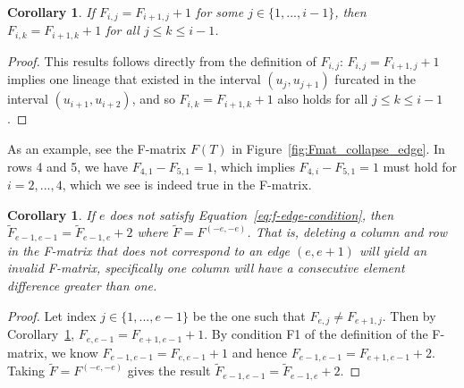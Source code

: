 \documentclass{article}
\newtheorem{corollary}[theorem]{Corollary}
\begin{document}
\begin{corollary}\label{cor:F_row_diff}
If $F_{i,j} = F_{i+1, j}+1$ for some $j\in \{1,...,i-1\}$, then $F_{i,k}= F_{i+1, k}+1$ for all $j\leq k \leq i-1$.
\end{corollary}
\begin{proof}
This results follows directly from the definition of $F_{i,j}$: $F_{i,j} = F_{i+1, j}+1$ implies one lineage that existed in the interval $(u_j,u_{j+1})$ furcated in the interval $(u_{i+1}, u_{i+2})$, and so $F_{i,k}= F_{i+1, k}+1$ also holds for all $j\leq k \leq i-1$. 
\end{proof}

As an example, see the F-matrix $F(T)$ in Figure~\ref{fig:Fmat_collapse_edge}. In rows 4 and 5, we have $F_{4,1} - F_{5,1}=1$, which implies $F_{4,i}- F_{5,1}=1$ must hold for $i=2,...,4$, which we see is indeed true in the F-matrix. 

\begin{corollary}\label{cor:F_delete_illegal_row}
If $e$ does not satisfy Equation~\ref{eq:f-edge-condition}, then $\tilde{F}_{e-1, e-1} = \tilde{F}_{e-1, e}+2$ where $\tilde{F}= F^{(-e, -e)}$. That is, deleting a column and row in the F-matrix that does not correspond to an edge $(e, e+1)$ will yield an invalid F-matrix, specifically one column will have a consecutive element difference greater than one. 
\end{corollary}
\begin{proof}
Let index $j \in \{1,..., e-1\}$ be the one such that $F_{e,j} \neq F_{e+1, j}$. Then by Corollary~\ref{cor:F_row_diff}, $F_{e, e-1} = F_{e+1, e-1}+1$. By condition F1 of the definition of the F-matrix, we know $F_{e-1, e-1} = F_{e, e-1} +1$ and hence $F_{e-1, e-1} = F_{e+1, e-1}+2$. Taking $\tilde{F}= F^{(-e, -e)}$ gives the result $\tilde{F}_{e-1, e-1} = \tilde{F}_{e-1, e}+2$. 
\end{proof}
\end{document}
